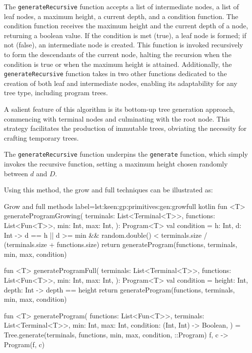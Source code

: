   The \texttt{generateRecursive} function accepts a list of intermediate nodes, 
  a list of leaf nodes, a maximum height, a current depth, and a condition 
  function. The condition function receives the maximum height and the current 
  depth of a node, returning a boolean value. If the condition is met (true), a 
  leaf node is formed; if not (false), an intermediate node is created. This 
  function is invoked recursively to form the descendants of the current node, 
  halting the recursion when the condition is true or when the maximum height is 
  attained. Additionally, the \texttt{generateRecursive} function takes in two 
  other functions dedicated to the creation of both leaf and intermediate nodes, 
  enabling its adaptability for any tree type, including program trees.

  A salient feature of this algorithm is its bottom-up tree generation approach, 
  commencing with terminal nodes and culminating with the root node. This 
  strategy facilitates the production of immutable trees, obviating the 
  necessity for crafting temporary trees.

  The \texttt{generateRecursive} function underpins the \texttt{generate} 
  function, which simply invokes the recursive function, setting a maximum 
  height chosen randomly between \(d\) and \(D\).

  Using this method, the grow and full techniques can be illustrated as:

  \begin{code}{Grow and full methods}{
    label=lst:keen:gp:primitives:gen:growfull
  }{kotlin}
    fun <T> generateProgramGrowing(
        terminals: List<Terminal<T>>,
        functions: List<Fun<T>>,
        min: Int,
        max: Int,
    ): Program<T> {
        val condition = { h: Int, d: Int ->
            d == h || 
              d >= min && random.double() < terminals.size / (terminals.size + functions.size)
        }
        return generateProgram(functions, terminals, min, max, condition)
    }

    fun <T> generateProgramFull(
        terminals: List<Terminal<T>>,
        functions: List<Fun<T>>,
        min: Int,
        max: Int,
    ): Program<T> {
        val condition = { height: Int, depth: Int ->
            depth == height
        }
        return generateProgram(functions, terminals, min, max, condition)
    }
    
    fun <T> generateProgram(
        functions: List<Fun<T>>,
        terminals: List<Terminal<T>>,
        min: Int,
        max: Int,
        condition: (Int, Int) -> Boolean,
    ) = Tree.generate(terminals, functions, min, max, condition, ::Program) { f, c ->
        Program(f, c)
    }
  \end{code}

